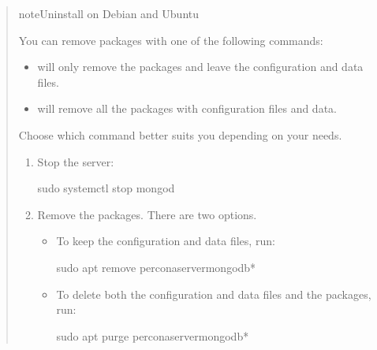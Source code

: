 \documentclass[letterpaper,10pt,english]{sphinxmanual}
\begin{document}
\label{\detokenize{install/uninstall:apt-uninstall}}\begin{quote}

\begin{sphinxadmonition}{note}{Uninstall on Debian and Ubuntu}

\sphinxAtStartPar
You can remove  packages with one of the following commands:
\begin{itemize}
\item {} 
\sphinxAtStartPar
{} will only remove the packages and leave the configuration and data files.

\item {} 
\sphinxAtStartPar
{} will remove all the packages with configuration files and data.

\end{itemize}

\sphinxAtStartPar
Choose which command better suits you depending on your needs.
\begin{enumerate}
%
\item {} 
\sphinxAtStartPar
Stop the  server:

\begin{sphinxVerbatim}[commandchars=\\\{\}]
\PYGZdl{} sudo systemctl stop mongod
\end{sphinxVerbatim}

\item {} 
\sphinxAtStartPar
Remove the packages. There are two options.
\begin{itemize}
\item {} 
\sphinxAtStartPar
To keep the configuration and data files, run:

\begin{sphinxVerbatim}[commandchars=\\\{\}]
\PYGZdl{} sudo apt remove percona\PYGZhy{}server\PYGZhy{}mongodb*
\end{sphinxVerbatim}

\item {} 
\sphinxAtStartPar
To delete both the configuration and data files and the packages, run:

\begin{sphinxVerbatim}[commandchars=\\\{\}]
\PYGZdl{} sudo apt purge percona\PYGZhy{}server\PYGZhy{}mongodb*
\end{sphinxVerbatim}


\end{itemize}
\end{enumerate}
\end{sphinxadmonition}
\end{quote}
\end{document}
